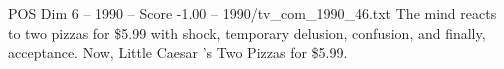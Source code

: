 \begin{textsample}{POS Dim 6 – 1990 – Score -1.00 – 1990/tv\_com\_1990\_46.txt}  \label{ex:f6_pos_077}
The mind reacts to two pizzas for \$5.99 with shock, temporary delusion, confusion, and finally, acceptance.
Now, Little Caesar 's Two Pizzas for \$5.99.

\end{textsample}
